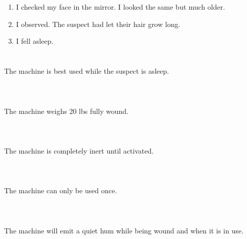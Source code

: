 \documentclass{article}
\begin{document}
    \newpage
    
    \section{}
    
    \begin{enumerate}
    
    \item I checked my face in the mirror. I looked the same but much older.\\
    
    \item I observed. The suspect had let their hair grow long.\\
    
    \item I fell asleep.\\
    
    \end{enumerate}
     
    \newpage
    
    \section{}
    The machine is best used while the suspect is asleep.\\\\ 
    \newpage
    
    \section{}
    The machine weighs 20 lbs fully wound.\\\\ 
    \newpage
    
    \section{}
    The machine is completely inert until activated.\\\\ 
    \newpage
    
    \section{}
    The machine can only be used once.\\\\ 
    \newpage
    
    \section{}
    The machine will emit a quiet hum while being wound and when it is in use.\\\\ 
    \newpage
    
\end{document}
